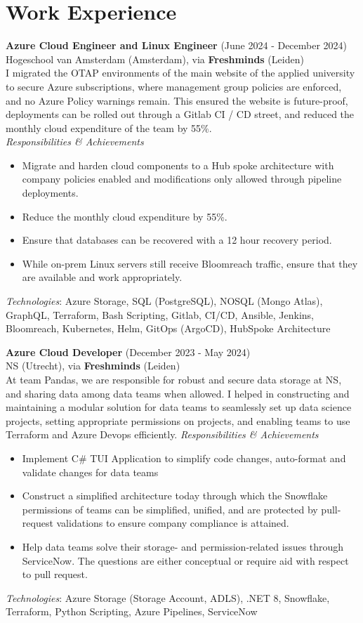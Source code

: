 \documentclass[a4paper,8pt]{article}
\begin{document}
\section{Work Experience}
\textbf{Azure Cloud Engineer and Linux Engineer} (June 2024 - December 2024) \\
Hogeschool van Amsterdam (Amsterdam), via \textbf{Freshminds} (Leiden) \\
I migrated the OTAP environments of the main website of the applied university to secure Azure subscriptions, 
 where management group policies are enforced, and no Azure Policy warnings remain.
 This ensured the website is future-proof,
deployments can be rolled out through a Gitlab CI / CD street, and reduced the monthly cloud expenditure of the team by 55\%. \\
\textit{Responsibilities \& Achievements}
\begin{itemize}
\item Migrate and harden cloud components to a Hub spoke architecture with company policies enabled and modifications only allowed through pipeline deployments.
\item Reduce the monthly cloud expenditure by 55\%.
\item Ensure that databases can be recovered with a 12 hour recovery period.
\item While on-prem Linux servers still receive Bloomreach traffic, ensure that they are available and work appropriately.
\end{itemize}
\textit{Technologies}: Azure Storage, SQL (PostgreSQL), NOSQL (Mongo Atlas),  GraphQL, Terraform, Bash Scripting, Gitlab, CI/CD, Ansible, Jenkins, Bloomreach,
Kubernetes, Helm, GitOps (ArgoCD), HubSpoke Architecture

\textbf{Azure Cloud Developer} (December 2023 - May 2024) \\
NS (Utrecht), via \textbf{Freshminds} (Leiden) \\
  At team Pandas, we are responsible for robust and secure data storage at NS,
  and sharing data among data teams when allowed. I helped in constructing and maintaining a modular solution for data teams to seamlessly set up data science projects, setting appropriate permissions on projects, and enabling teams to use Terraform and Azure Devops efficiently.
  \textit{Responsibilities \& Achievements}
  \begin{itemize}
    \item Implement C\# TUI Application to simplify code changes, auto-format and validate changes for data teams
    \item Construct a simplified architecture today through which the Snowflake permissions of teams can be simplified, unified, and are protected by pull-request validations to ensure company compliance is attained.
    \item Help data teams solve their storage- and permission-related issues through ServiceNow. The questions are either conceptual or require aid with respect to pull request.
  \end{itemize}
\textit{Technologies}: Azure Storage (Storage Account, ADLS), .NET 8, Snowflake, Terraform, Python Scripting, Azure Pipelines, ServiceNow
	
\end{document}
